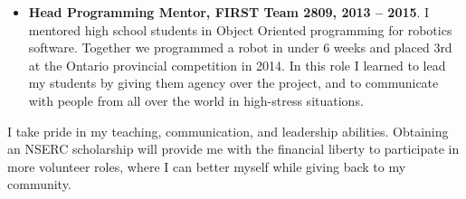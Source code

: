 \documentclass[a4paper,12pt]{article}
\begin{document}
\begin{itemize}
\item \textbf{Head Programming Mentor, FIRST Team 2809, 2013 -- 2015}. 
    I mentored high school students in Object Oriented programming for robotics
    software. Together we programmed a robot in under 6 weeks and placed 3rd at
    the Ontario provincial competition in 2014.
    In this role I learned to lead my students by giving them agency over the
    project, and to communicate with people from all over the world in
    high-stress situations.

\end{itemize}

I take pride in my teaching, communication, and leadership abilities.
Obtaining an NSERC scholarship will provide me with the financial liberty to
participate in more volunteer roles, where I can better myself while giving back to my
community.
\end{document}
